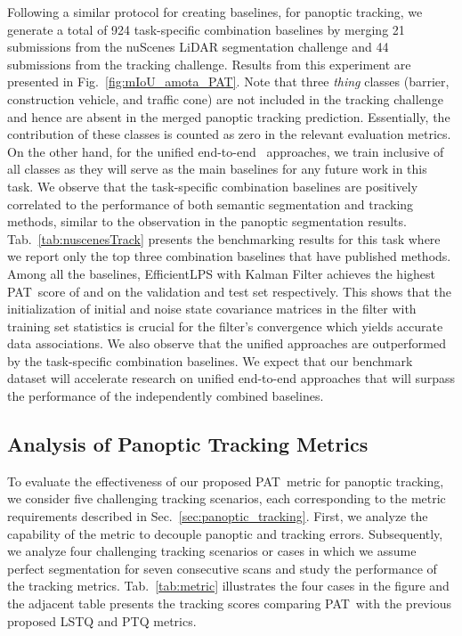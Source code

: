 \documentclass[letterpaper, 10 pt, journal, twoside]{IEEEtran}
\newcommand{\secref}[1]{Sec.~\ref{#1}}
\newcommand{\figref}[1]{Fig.~\ref{#1}}
\newcommand{\tabref}[1]{Tab.~\ref{#1}}
\newcommand{\newmet}{PAT}
\begin{document}
Following a similar protocol for creating baselines, for panoptic tracking, we generate a total of 924 task-specific combination baselines by merging 21 submissions from the nuScenes LiDAR segmentation challenge and 44 submissions from the tracking challenge. Results from this experiment are presented in \figref{fig:mIoU_amota_PAT}. Note that three \emph{thing} classes (barrier, construction vehicle, and traffic cone) are not included in the tracking challenge and hence are absent in the merged panoptic tracking prediction. Essentially, the contribution of these classes is counted as zero in the relevant evaluation metrics. On the other hand, for the unified end-to-end~\cite{hurtado2020mopt, aygun20214d} approaches, we train inclusive of all classes as they will serve as the main baselines for any future work in this task. We observe that the task-specific combination baselines are positively correlated to the performance of both semantic segmentation and tracking methods, similar to the observation in the panoptic segmentation results. \tabref{tab:nuscenesTrack} presents the benchmarking results for this task where we report only the top three combination baselines that have published methods. Among all the baselines, EfficientLPS with Kalman Filter achieves the highest \newmet~score of  and  on the validation and test set respectively. This shows that the initialization of initial and noise state covariance matrices in the filter with training set statistics is crucial for the filter's convergence which yields accurate data associations. We also observe that the unified approaches are outperformed by the task-specific combination baselines. We expect that our benchmark dataset will accelerate research on unified end-to-end approaches that will surpass the performance of the independently combined baselines.

\subsection{Analysis of Panoptic Tracking Metrics}
\label{subsec:new_metric_analysis}

To evaluate the effectiveness of our proposed \newmet~metric for panoptic tracking, we consider five challenging tracking scenarios, each corresponding to the metric requirements described in \secref{sec:panoptic_tracking}. First, we analyze the capability of the metric to decouple panoptic and tracking errors. Subsequently, we analyze four challenging tracking scenarios or cases in which we assume perfect segmentation for seven consecutive scans and study the performance of the tracking metrics. \tabref{tab:metric} illustrates the four cases in the figure and the adjacent table presents the tracking scores comparing \newmet~with the previous proposed LSTQ and PTQ metrics.
\end{document}
